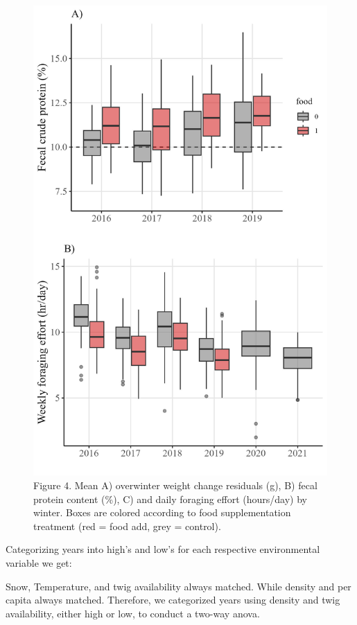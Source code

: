 \documentclass[
]{article}
\begin{document}
\begin{figure}
\centering
\includegraphics{Output/Figures/dep_var_figure.jpeg}
\caption{Figure 4. Mean A) overwinter weight change residuals (g), B)
fecal protein content (\%), C) and daily foraging effort (hours/day) by
winter. Boxes are colored according to food supplementation treatment
(red = food add, grey = control).}
\end{figure}

Categorizing years into high's and low's for each respective
environmental variable we get:

Snow, Temperature, and twig availability always matched. While density
and per capita always matched. Therefore, we categorized years using
density and twig availability, either high or low, to conduct a two-way
anova.
\end{document}

